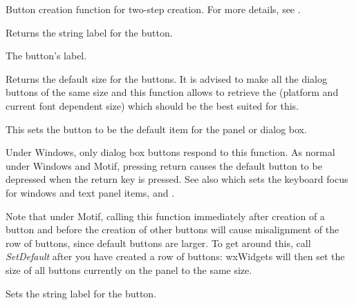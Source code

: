 Button creation function for two-step creation. For more details, see
.

\label{wxbuttongetlabel}


Returns the string label for the button.


The button's label.



\label{wxbuttongetdefaultsize}


Returns the default size for the buttons. It is advised to make all the dialog
buttons of the same size and this function allows to retrieve the (platform and
current font dependent size) which should be the best suited for this.

\label{wxbuttonsetdefault}


This sets the button to be the default item for the panel or dialog
box.


Under Windows, only dialog box buttons respond to this function.  As
normal under Windows and Motif, pressing return causes the default button to
be depressed when the return key is pressed. See also \rtfsp
which sets the keyboard focus for windows and text panel items,\rtfsp
and .

Note that under Motif, calling this function immediately after
creation of a button and before the creation of other buttons
will cause misalignment of the row of buttons, since default
buttons are larger. To get around this, call {\it SetDefault}\rtfsp
after you have created a row of buttons: wxWidgets will
then set the size of all buttons currently on the panel to
the same size.

\label{wxbuttonsetlabel}


Sets the string label for the button.





